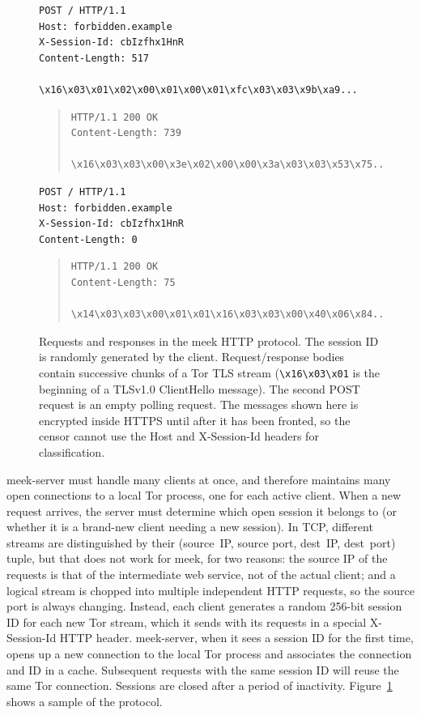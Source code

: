 \documentclass{sig-alternate}
\newcommand{\meekserver}{\mbox{meek-server}\xspace}
\newcommand{\meek}{meek\xspace}
\begin{document}
\begin{figure}
\scriptsize
\begin{verbatim}
POST / HTTP/1.1
Host: forbidden.example
X-Session-Id: cbIzfhx1HnR
Content-Length: 517

\x16\x03\x01\x02\x00\x01\x00\x01\xfc\x03\x03\x9b\xa9...
\end{verbatim}
\begin{quote}
\begin{verbatim}
HTTP/1.1 200 OK
Content-Length: 739

\x16\x03\x03\x00\x3e\x02\x00\x00\x3a\x03\x03\x53\x75...
\end{verbatim}
\end{quote}
\begin{verbatim}
POST / HTTP/1.1
Host: forbidden.example
X-Session-Id: cbIzfhx1HnR
Content-Length: 0

\end{verbatim}
\begin{quote}
\begin{verbatim}
HTTP/1.1 200 OK
Content-Length: 75

\x14\x03\x03\x00\x01\x01\x16\x03\x03\x00\x40\x06\x84...
\end{verbatim}
\end{quote}
\caption{
Requests and responses in the \meek HTTP protocol.
The session ID is randomly generated by the client.
Request/response bodies contain successive chunks of a Tor TLS stream
(\texttt{\textbackslash{}x16\textbackslash{}x03\textbackslash{}x01}
is the beginning of a TLSv1.0 ClientHello message).
The second POST request is an empty polling request.
The messages shown here is encrypted inside HTTPS until after
it has been fronted,
so the censor cannot use the
Host and \mbox{X-Session-Id} headers for classification.
}
\label{fig:protocol}
\end{figure}

\meekserver must handle many clients at once,
and therefore maintains many open connections to a local Tor process,
one for each active client.
When a new request arrives, the server must determine which
open session it belongs to
(or whether it is a brand-new client needing a new session).
In TCP, different streams are distinguished by their
(source~IP, source port, dest~IP, dest~port) tuple,
but that does not work for \meek, for two reasons:
the source IP of the requests is that of the intermediate web service,
not of the actual client;
and a logical stream is chopped into multiple independent HTTP requests,
so the source port is always changing.
Instead, each client generates a random 256-bit
session ID for each new Tor stream,
which it sends with its requests in a special
\mbox{X-Session-Id} HTTP header.
\meekserver, when it sees a session ID for the first time,
opens up a new connection to the local Tor process
and associates the connection and ID in a cache.
Subsequent requests with the
same session ID will reuse the same Tor connection.
Sessions are closed after a period of inactivity.
Figure~\ref{fig:protocol} shows a sample of the protocol.
\end{document}
